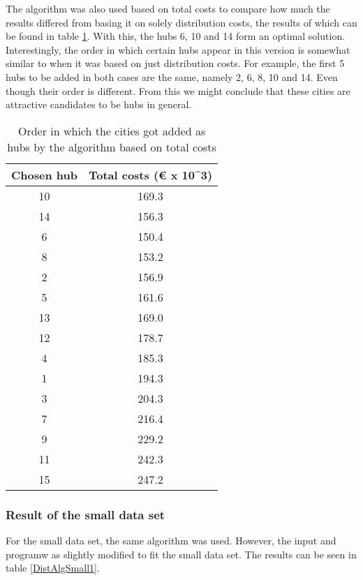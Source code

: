 \documentclass{article}
\begin{document}
The algorithm was also used based on total costs to compare how much the results differed from basing it on solely distribution costs, the results of which can be found in table \ref{DistAlg2}. With this, the hubs 6, 10 and 14 form an optimal solution. Interestingly, the order in which certain hubs appear in this version is somewhat similar to when it was based on just distribution costs. For example, the first 5 hubs to be added in both cases are the same, namely 2, 6, 8, 10 and 14. Even though their order is different. From this we might conclude that these cities are attractive candidates to be hubs in general.

\begin{table}[h]
\centering
\begin{tabular}{||c|c||}
\hline
    Chosen hub & Total costs (€ x 10^3) \\
\hline
\hline
    10 & 169.3 \\
    \hline
    14 & 156.3 \\
    \hline
    6 & 150.4 \\
    \hline
    8 & 153.2 \\
    \hline
    2 & 156.9 \\
    \hline
    5 & 161.6 \\
    \hline
    13 & 169.0 \\
    \hline
    12 & 178.7 \\
    \hline
    4 & 185.3 \\
    \hline
    1 & 194.3 \\
    \hline
    3 & 204.3 \\
    \hline
    7 & 216.4 \\
    \hline
    9 & 229.2 \\
    \hline
    11 & 242.3 \\
    \hline
    15 & 247.2 \\
    \hline
\end{tabular}

\caption{\centering Order in which the cities got added as hubs by the algorithm based on total costs}
\label{DistAlg2}
\end{table}
\subsubsection{Result of the small data set}
For the small data set, the same algorithm was used. However, the input and programw as slightly modified to fit the small data set. The results can be seen in table \ref{DistAlgSmall1}.
\end{document}
